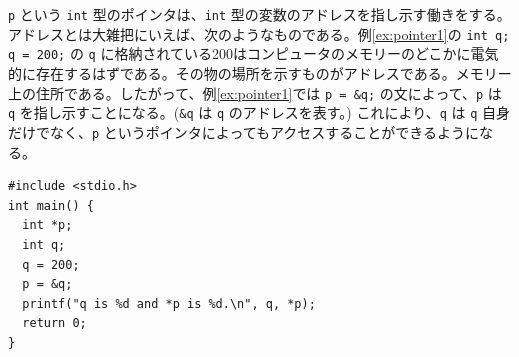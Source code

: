 \verb|p| という \verb|int| 型のポインタは、\verb|int| 型の変数のアドレスを指し示す働きをする。アドレスとは大雑把にいえば、次のようなものである。例\ref{ex:pointer1}の \verb|int q; q = 200;| の \verb|q| に格納されている200はコンピュータのメモリーのどこかに電気的に存在するはずである。その物の場所を示すものがアドレスである。メモリー上の住所である。したがって、例\ref{ex:pointer1}では \verb|p = &q;| の文によって、\verb|p| は \verb|q| を指し示すことになる。(\verb|&q| は \verb|q| のアドレスを表す。) これにより、\verb|q| は \verb|q| 自身だけでなく、\verb|p| というポインタによってもアクセスすることができるようになる。
\begin{reidai}\label{ex:pointer1}
\begin{verbatim}
#include <stdio.h>
int main() {
  int *p;
  int q;
  q = 200;
  p = &q;
  printf("q is %d and *p is %d.\n", q, *p);
  return 0;
}
\end{verbatim}
\end{reidai}
\begin{figure}[H]
\begin{center}
\end{center}
\end{figure}

